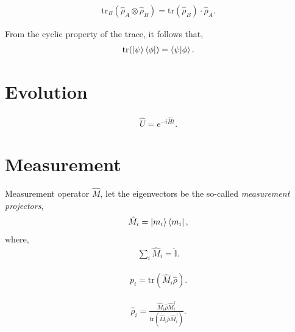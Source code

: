 \documentclass[aps,pra,twocolumn,amsmath,amssymb,nofootinbib,superscriptaddress]{revtex4}
\begin{document}
\begin{align}
\mathrm{tr}_B(\hat\rho_A\otimes\hat\rho_B) = \mathrm{tr}(\hat\rho_B) \cdot \hat\rho_A.
\end{align}

From the cyclic property of the trace, it follows that,
\begin{align}
\mathrm{tr}(\ket\psi\bra\phi) = \braket{\psi|\phi}.	
\end{align}

%
%

\section{Evolution}

\begin{align}
\hat{U} = e^{-i\hat{H}t}.	
\end{align}

%
%

\section{Measurement}

Measurement operator $\hat{M}$, let the eigenvectors be the so-called \textit{measurement projectors},
\begin{align}
\hat{M}_i = \ket{m_i}\bra{m_i},	
\end{align}
where,
\begin{align}
\sum_i \hat{M}_i = \hat{\mathbb{I}}.	
\end{align}

\begin{align}
p_i = \mathrm{tr}(\hat{M}_i\hat\rho).
\end{align}

\begin{align}
\hat\rho_i = \frac{\hat{M}_i\hat\rho\hat{M}_i^\dag}{\mathrm{tr}(\hat{M}_i\hat\rho\hat{M}_i^\dag)}.
\end{align}
\end{document}
